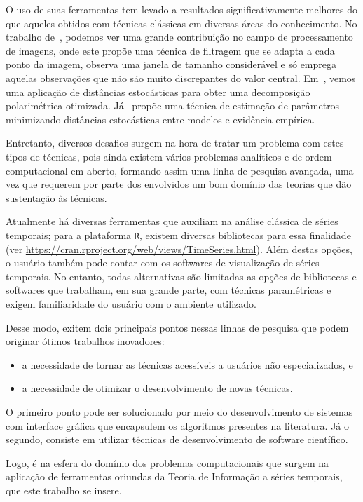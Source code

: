O uso de suas ferramentas tem levado a resultados significativamente melhores do que aqueles obtidos com técnicas clássicas em diversas áreas do conhecimento. No trabalho de~\cite{Torres2014}, podemos ver uma grande contribuição no campo de processamento de imagens, onde este propõe uma técnica de filtragem que se adapta a cada ponto da imagem, observa uma janela de tamanho considerável e só emprega aquelas observações que não são muito discrepantes do valor central. Em~\cite{Bhattacharya2015}, vemos uma aplicação de distâncias estocásticas para obter uma decomposição polarimétrica otimizada. Já~ \cite{Gambini2015} propõe uma técnica de estimação de parâmetros minimizando distâncias estocásticas entre modelos e evidência empírica.

Entretanto, diversos desafios surgem na hora de tratar um problema com estes tipos de técnicas, pois ainda existem vários problemas analíticos e de ordem computacional em aberto, formando assim uma linha de pesquisa avançada, uma vez que requerem por parte dos envolvidos um bom domínio das teorias que dão sustentação às técnicas.

Atualmente há diversas ferramentas que auxiliam na análise clássica de séries temporais; para a plataforma \texttt  R, existem diversas bibliotecas para essa finalidade (ver \url{https://cran.rproject.org/web/views/TimeSeries.html}). Além destas opções, o usuário também pode contar com os softwares de visualização de séries temporais. No entanto, todas alternativas são limitadas as opções de bibliotecas e softwares que trabalham, em sua grande parte, com técnicas paramétricas e exigem familiaridade do usuário com o ambiente utilizado.

Desse modo, exitem dois principais pontos nessas linhas de pesquisa que podem originar ótimos trabalhos inovadores:

\begin{itemize}
\item a necessidade de tornar as técnicas acessíveis a usuários não especializados, e
\item a necessidade de otimizar o desenvolvimento de novas técnicas.
\end{itemize}

O primeiro ponto pode ser solucionado por meio do desenvolvimento de sistemas com interface gráfica que encapsulem os algoritmos presentes na literatura. Já o segundo, consiste em utilizar técnicas de desenvolvimento de software científico.

Logo, é na esfera do domínio dos problemas computacionais que surgem na aplicação de ferramentas oriundas da Teoria de Informação a séries temporais, que este trabalho se insere.
 
